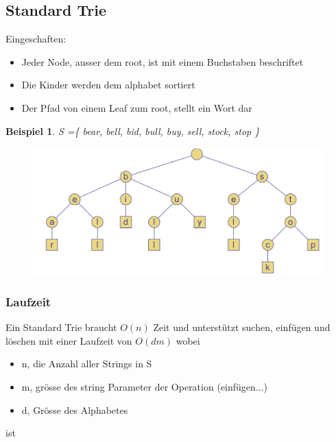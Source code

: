 \documentclass[a4paper,10pt]{report}
\newtheorem{myexample}{Beispiel}
\begin{document}
\subsection{Standard Trie}
Eingeschaften:
\begin{itemize}
	\item
	Jeder Node, ausser dem root, ist mit einem Buchstaben beschriftet
	\item
	Die Kinder werden dem alphabet sortiert
	\item
	Der Pfad von einem Leaf zum root, stellt ein Wort dar
\end{itemize}
\begin{myexample}
S =\{ bear, bell, bid, bull, buy, sell, stock, stop \}
\begin{figure}[H]
	\begin{center}
  		\includegraphics[width=\textwidth]{img/standardtrie.png}
	\end{center}
\end{figure}
\end{myexample}
\subsubsection{Laufzeit}
Ein Standard Trie braucht $O(n)$ Zeit und unterstützt suchen, einfügen und löschen mit einer Laufzeit von $O(dm)$ wobei
\begin{itemize}
	\item 
		n, die Anzahl aller Strings in S
	\item
		m, grösse des string Parameter der Operation (einfügen...)
	\item
		d, Grösse des Alphabetes
\end{itemize}
ist
\newpage
\end{document}
